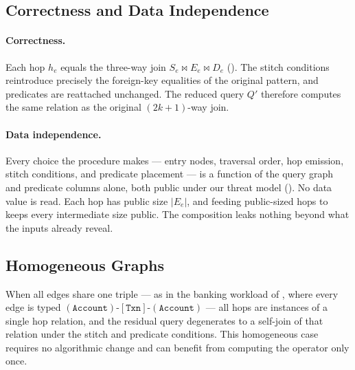 \subsection{Correctness and Data Independence}
\label{sec:decomposition:correctness}

\paragraph{Correctness.}
Each hop $h_e$ equals the three-way join $S_e \bowtie E_e \bowtie D_e$
(). The stitch conditions reintroduce precisely the
foreign-key equalities of the original pattern, and predicates are
reattached unchanged. The reduced query $Q'$ therefore computes the same
relation as the original $(2k{+}1)$-way join.

\paragraph{Data independence.}
Every choice the procedure makes --- entry nodes, traversal order, hop
emission, stitch conditions, and predicate placement --- is a function of
the query graph and predicate columns alone, both public under our threat
model (). No data value is read. Each hop has
public size $|E_e|$, and feeding public-sized hops to \wei keeps every
intermediate size public. The composition leaks nothing beyond what the
inputs already reveal.

\subsection{Homogeneous Graphs}
\label{sec:decomposition:homogeneous}

When all edges share one triple --- as in the banking workload of
, where every edge is typed
$(\texttt{Account})\text{-}[\texttt{Txn}]\text{-}(\texttt{Account})$ ---
all hops are instances of a single hop relation, and the residual query
degenerates to a self-join of that relation under the stitch and predicate
conditions. This homogeneous case requires no algorithmic change and can
benefit from computing the \onehop operator only once.


